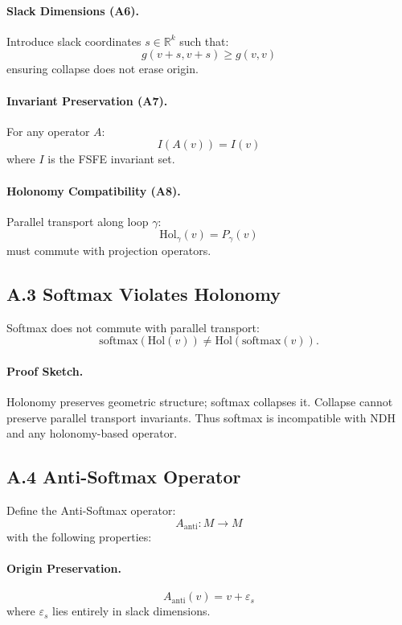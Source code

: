 \paragraph{Slack Dimensions (A6).}
Introduce slack coordinates $s \in \mathbb{R}^k$ such that:
\[
g(v + s, v + s) \ge g(v, v)
\]
ensuring collapse does not erase origin.

\paragraph{Invariant Preservation (A7).}
For any operator $A$:
\[
I(A(v)) = I(v)
\]
where $I$ is the FSFE invariant set.

\paragraph{Holonomy Compatibility (A8).}
Parallel transport along loop $\gamma$:
\[
\mathrm{Hol}_\gamma(v) = P_\gamma(v)
\]
must commute with projection operators.

\subsection{A.3 Softmax Violates Holonomy}

Softmax does not commute with parallel transport:
\[
\mathrm{softmax}(\mathrm{Hol}(v)) \neq \mathrm{Hol}(\mathrm{softmax}(v)).
\]

\paragraph{Proof Sketch.}
Holonomy preserves geometric structure; softmax collapses it.
Collapse cannot preserve parallel transport invariants.
Thus softmax is incompatible with NDH and any holonomy-based operator.

\subsection{A.4 Anti-Softmax Operator}

Define the Anti-Softmax operator:
\[
A_{\mathrm{anti}} : M \rightarrow M
\]
with the following properties:

\paragraph{Origin Preservation.}
\[
A_{\mathrm{anti}}(v) = v + \varepsilon_s
\]
where $\varepsilon_s$ lies entirely in slack dimensions.

